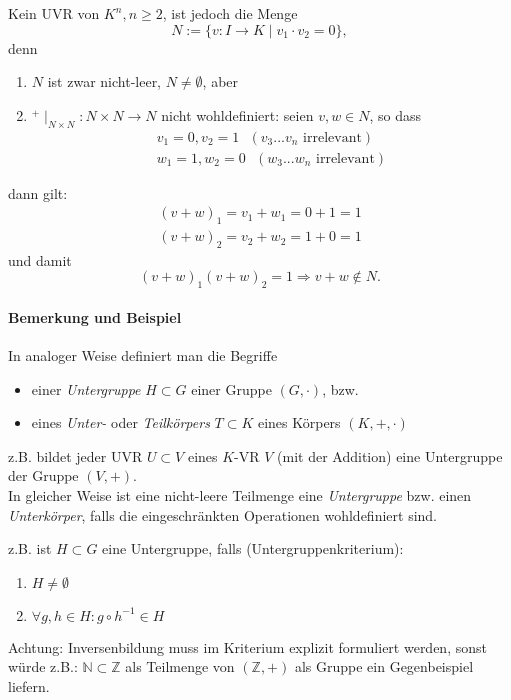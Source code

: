 	Kein UVR von $K^n, n\geq 2$, ist jedoch die Menge
		\[ N:=\{v:I\to K\mid v_1\cdot v_2 = 0\}, \]
	denn 
	\begin{enumerate}
		\item $N$ ist zwar nicht-leer, $N\neq \emptyset$, aber
		\item $^+\mid_{N\times N}: N\times N\to N$ nicht wohldefiniert: seien $v,w\in N$, so dass
			\begin{gather*}
				v_1=0, v_2=1\text{ }(v_3 ... v_n \text{ irrelevant})\\
				w_1=1, w_2 = 0\text{ }(w_3 ... w_n \text{ irrelevant})
			\end{gather*}
	\end{enumerate}
	dann gilt:
	\begin{gather*}
		(v+w)_1 = v_1 + w_1 = 0+1=1\\
		(v+w)_2 = v_2 + w_2 = 1+0 = 1
	\end{gather*}
	und damit
		\[ (v+w)_1(v+w)_2 = 1 \Rightarrow v+w\notin N. \]

\paragraph{Bemerkung und Beispiel}
	In analoger Weise definiert man die Begriffe
	\begin{itemize}
		\item einer \emph{Untergruppe} $H\subset G$ einer Gruppe $(G,\cdot)$, bzw.
		\item eines \emph{Unter-} oder \emph{Teilkörpers} $T\subset K$ eines Körpers $(K,+,\cdot )$
	\end{itemize}
	
	z.B. bildet jeder UVR $U\subset V$ eines $K$-VR $V$ (mit der Addition) eine Untergruppe der Gruppe $(V,+)$.\\
        In gleicher Weise ist eine nicht-leere Teilmenge eine \emph{Untergruppe} bzw. einen \emph{Unterkörper}, falls die eingeschränkten Operationen wohldefiniert sind.
    
        z.B. ist $H\subset G$ eine Untergruppe, falls (Untergruppenkriterium):
        \begin{enumerate}
            \item $H\neq \emptyset$
            \item $\forall g,h\in H: g\circ h^{-1} \in H$
        \end{enumerate}
            
	Achtung: Inversenbildung muss im Kriterium explizit formuliert werden, sonst würde z.B.: $\mathbb{N}\subset\mathbb{Z}$ als Teilmenge von $(\mathbb{Z}, +)$ als Gruppe ein Gegenbeispiel liefern.
        
